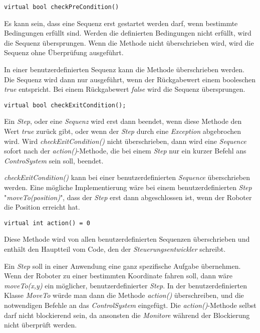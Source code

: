 \begin{lstlisting}
virtual bool checkPreCondition()
\end{lstlisting}
Es kann sein, dass eine Sequenz erst gestartet werden darf, wenn bestimmte Bedingungen erfüllt sind.
Werden die definierten Bedingungen nicht erfüllt, wird die Sequenz übersprungen.
Wenn die Methode nicht überschrieben wird, wird die Sequenz ohne Überprüfung ausgeführt.

In einer benutzerdefinierten Sequenz kann die Methode überschrieben werden.
Die Sequenz wird dann nur ausgeführt, wenn der Rückgabewert einem booleschen \textit{true} entspricht.
Bei einem Rückgabewert \textit{false} wird die Sequenz übersprungen.


\begin{lstlisting}
virtual bool checkExitCondition();
\end{lstlisting}
Ein \textit{Step}, oder eine \textit{Sequenz} wird erst dann beendet, wenn diese Methode den Wert \textit{true} zurück gibt, oder wenn der \textit{Step} durch eine \textit{Exception} abgebrochen wird.
Wird \textit{checkExitCondition()} nicht überschrieben, dann wird eine \textit{Sequence} sofort nach der \textit{action()}-Methode, die bei einem \textit{Step} nur ein kurzer Befehl ans \textit{ControSystem} sein soll, beendet.

\textit{checkExitCondition()} kann bei einer benutzerdefinierten \textit{Sequence} überschrieben werden.
Eine mögliche Implementierung wäre bei einem benutzerdefinierten \textit{Step} "\textit{moveTo(position)}", dass der \textit{Step} erst dann abgeschlossen ist, wenn der Roboter die Position erreicht hat.



\begin{lstlisting}
virtual int action() = 0
\end{lstlisting}
Diese Methode wird von allen benutzerdefinierten Sequenzen überschrieben und enthält den Hauptteil vom Code, den der \textit{Steuerungsentwickler} schreibt.

Ein \textit{Step} soll in einer Anwendung eine ganz spezifische Aufgabe übernehmen.
Wenn der Roboter zu einer bestimmten Koordinate fahren soll, dann wäre \textit{moveTo(x,y)} ein möglicher, benutzerdefinierter \textit{Step}.
In der benutzerdefinierten Klasse \textit{MoveTo} würde man dann die Methode \textit{action()} überschreiben, und die notwendigen Befehle an das \textit{ControlSystem} eingefügt.
Die \textit{action()}-Methode selbst darf nicht blockierend sein, da ansonsten die \textit{Monitore} während der Blockierung nicht überprüft werden.

